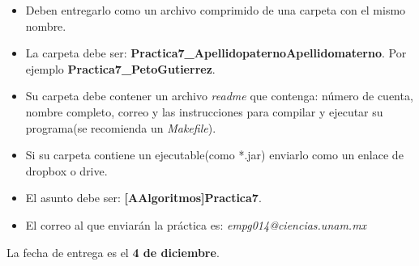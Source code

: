 \documentclass{article}
\begin{document}
\begin{itemize}
\item Deben entregarlo como un archivo comprimido de una carpeta con el mismo nombre.
\item La carpeta debe ser: \textbf{Practica7\_ApellidopaternoApellidomaterno}. Por ejemplo \textbf{Practica7\_PetoGutierrez}.
\item Su carpeta debe contener un archivo \emph{readme} que contenga: número de cuenta, nombre completo, 
correo y las instrucciones para compilar y ejecutar su programa(se recomienda un \emph{Makefile}).
\item Si su carpeta contiene un ejecutable(como *.jar) enviarlo como un enlace de dropbox o drive.
\item El asunto debe ser: \textbf{[AAlgoritmos]Practica7}.
\item El correo al que enviarán la práctica es: \emph{empg014@ciencias.unam.mx}
\end{itemize}

La fecha de entrega es el \textbf{4 de diciembre}.
\end{document}
